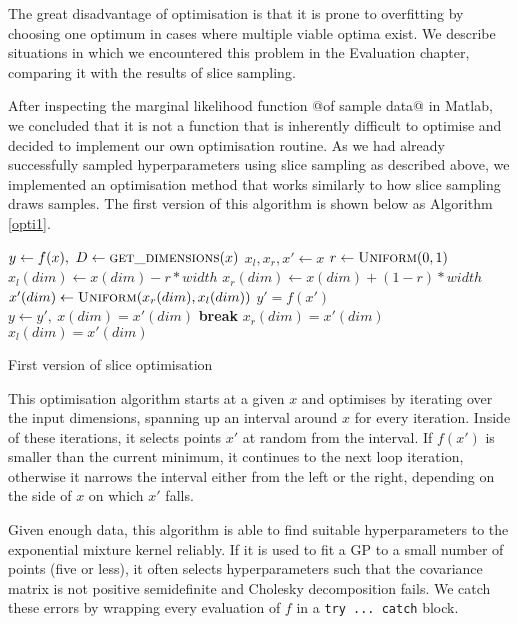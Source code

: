 \documentclass[a4paper,12pt,twoside,openright]{report}
\newcommand{\Break}{\State \textbf{break} }
\begin{document}
The great disadvantage of optimisation is that it is prone to overfitting by choosing one optimum in cases where multiple viable optima exist. We describe situations in which we encountered this problem in the Evaluation chapter, comparing it with the results of slice sampling.



After inspecting the marginal likelihood function @of sample data@ in Matlab, we concluded that it is not a function that is inherently difficult to optimise and decided to implement our own optimisation routine. As we had already successfully sampled hyperparameters using slice sampling as described above, we implemented an optimisation method that works similarly to how slice sampling draws samples. The first version of this algorithm is shown below as Algorithm \ref{opti1}.


\begin{algorithm}
\begin{algorithmic}[1]
\State $y\gets f(x),\ D\gets \Call{get\_dimensions}{x}$
\State $x_l, x_r, x'\gets x$
\State $r\gets \Call{Uniform}{0, 1}$
\State $x_l(dim)\gets x(dim) - r * width$
\State $x_r(dim)\gets x(dim) + (1 - r) * width$
\State $x'(dim)\gets \Call{Uniform}{x_r(dim), x_l(dim)}$
\State $y' = f(x')$
\State $y\gets y',\ x(dim) = x'(dim)$
\Break
\EndIf
{}
\State $x_r(dim) = x'(dim)$
\State $x_l(dim) = x'(dim)$
\EndIf
\EndFor
\EndFor
\EndFor
\EndProcedure
\end{algorithmic}
\caption{First version of slice optimisation}
\label{opti1}
\end{algorithm}

This optimisation algorithm starts at a given $x$ and optimises by iterating over the input dimensions, spanning up an interval around $x$ for every iteration. Inside of these iterations, it selects points $x'$ at random from the interval. If $f(x')$ is smaller than the current minimum, it continues to the next loop iteration, otherwise it narrows the interval either from the left or the right, depending on the side of $x$ on which $x'$ falls.

Given enough data, this algorithm is able to find suitable hyperparameters to the exponential mixture kernel reliably. If it is used to fit a GP to a small number of points (five or less), it often selects hyperparameters such that the covariance matrix is not positive semidefinite and Cholesky decomposition fails. We catch these errors by wrapping every evaluation of $f$ in a \texttt{try ... catch} block. 
\end{document}
